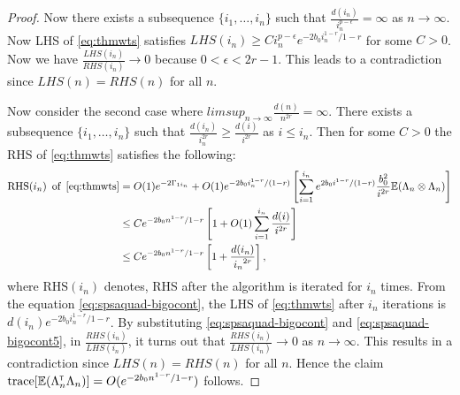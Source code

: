 \begin{proof}
Now there exists a subsequence $\{i_1,\ldots,i_n\}$ such that $ \frac{d(i_n)}{i_n^{p-\epsilon}} = \infty$ as $n \to \infty$. Now LHS of \eqref{eq:thmwts} satisfies $LHS(i_n) \ge C i_n^{p-\epsilon} e^{-2b_0 i_n^{1-r} / {1-r}}$ for some $C > 0$. Now we have $\frac{LHS(i_n)}{RHS(i_n)} \to 0$ because  $0 < \epsilon < 2r -1$. This leads to a contradiction since $LHS(n) = RHS(n)$ for all $n$.

Now consider the second case where $lim sup_{n \to \infty} \frac{d(n)}{n^{2r}} = \infty$. There exists a subsequence $\{i_1,\ldots,i_n\}$ such that $ \frac{d(i_n)}{i_n^{2r}} \ge \frac{d(i)}{i^{2r}}$ as $i \le i_n$. Then for some $C >0$ the RHS of \eqref{eq:thmwts} satisfies the following:
\begin{align}
\text{RHS}(i_n)\,\,\,  \text{of}  \,\,\,\eqref{eq:thmwts} &= O(1) e^{-2 \Gamma_{1i_n}} +  O(1) e^{-2 b_0 i_n^{1-r}/(1-r)} \left[\sum_{i=1}^{i_n} e^{2 b_0 i^{1-r}/(1-r)} \frac{b_0^2}{i^{2r}} \mathbb{E} (\Lambda_{n} \otimes \Lambda_{n}) \right]\nonumber \\
&\le C e^{-2b_0n^{1-r} / {1-r}} \left[ 1 + O(1) \sum_{i =1}^{i_n} \frac{d(i)}{i^{2r}}\right]\nonumber \\
&\le C e^{-2b_0n^{1-r} / {1-r}} \left[ 1 + \frac{d(i_n)}{{i_n}^{2r}}\right],
\label{eq:spsaquad-bigocont5}
\end{align}
where $\text{RHS}(i_n)$ denotes, RHS after the algorithm is iterated for $i_n$ times. From the equation \eqref{eq:spsaquad-bigocont}, the  LHS of \eqref{eq:thmwts} after $i_n$ iterations is $d(i_n) e^{-2b_0 i_n^{1-r} / {1-r}}$. By substituting \eqref{eq:spsaquad-bigocont} and \eqref{eq:spsaquad-bigocont5}, in $\frac{RHS(i_n)}{LHS(i_n)}$, it turns out that $\frac{RHS(i_n)}{LHS(i_n)} \to 0$ as $n \to \infty$. This results in a contradiction since $LHS(n) = RHS(n)$ for all $n$. Hence the claim $\text{trace}[\mathbb{E} (\Lambda_n ^\mathsf{\scriptscriptstyle T} \Lambda_n)] = O(e^{-2b_0n^{1-r} / {1-r}})$ follows.
\end{proof}



